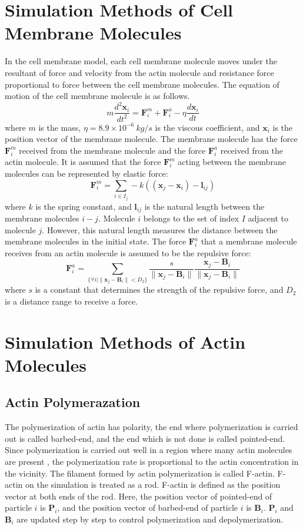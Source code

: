 \documentclass[a4paper,12pt]{book}
\begin{document}
\section{Simulation Methods of Cell Membrane Molecules}
In the cell membrane model, each cell membrane molecule moves under the resultant of force and velocity from the actin molecule and resistance force proportional to force between the cell membrane molecules. The equation of motion of the cell membrane molecule is as follows.
\begin{equation}
m\frac{d^2\bm{x}_i}{dt^2} = \bm{F}^m_i +  \bm{F}^a_i - \eta \frac{d\bm{x}_i}{dt}
\end{equation}
where  $m$ is the mass, $\eta = 8.9\times10^{-6}\si{~kg/s}$ is the viscous coefficient, and $\bm{x}_i$ is the position vector of the membrane molecule. The membrane molecule has the force  $\bm{F}^m_i$ received from the membrane molecule and the force  $\bm{F}^a_i$ received from the actin molecule. It is assumed that the force  $\bm{F}^m_i$ acting between the membrane molecules can be represented by elastic force:
\begin{equation}
\bm{F}^m_i = \sum_{i \in I_j}  -k((\bm{x}_j -\bm{x}_i )-\bm{l}_{ij} )
\end{equation}
where $k$ is the spring constant, and $\bm{l}_{ij}$ is the natural length between the membrane molecules $i-j$. Molecule  $i$ belongs to the set of index $I$ adjacent to molecule $j$. However, this natural length measures the distance between the membrane molecules in the initial state. The force  $\bm{F}^a_i$ that a membrane molecule receives from an actin molecule is assumed to be the repulsive force:
\begin{equation}
\bm{F}^a_i = \sum_{\{ \forall i | \| \bm{x}_j - \bm{B}_i \|<D_2\}} \frac{s}{\|\bm{x}_j -\bm{B}_i \|} \frac{\bm{x}_j -\bm{B}_i }{\|\bm{x}_j -\bm{B}_i \|}
\end{equation}
where $s$ is a constant that determines the strength of the repulsive force, and $D_2$ is a distance range to receive a force.


\section{Simulation Methods of Actin Molecules}
\subsection{Actin Polymerazation}
The polymerization of actin has polarity, the end where polymerization is carried out is called barbed-end, and the end which is not done is called pointed-end. Since polymerization is carried out well in a region where many actin molecules are present , the polymerization rate is proportional to the actin concentration in the vicinity.  The filament formed by actin polymerization is called F-actin. F-actin on the simulation is treated as a rod. F-actin is defined as the position vector at both ends of the rod.
Here, the position vector of pointed-end of particle $i$ is $\bm{P}_i$, and the position vector of barbed-end of particle $i$ is $\bm{B}_i$.
$\bm{P}_i$ and $\bm{B}_i$ are updated step by step to control polymerization and depolymerization.
\end{document}

